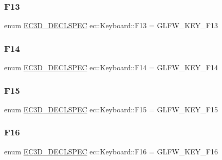 \mbox{\label{classec_1_1_keyboard_a57c5cc1e503cb08d453b6fee1f2dea47}} 
\subsubsection{\texorpdfstring{F13}{F13}}
{\footnotesize\ttfamily enum \mbox{\hyperlink{_common_8h_aac42573e202ca3dd4d259c81691e2369}{E\+C3\+D\+\_\+\+D\+E\+C\+L\+S\+P\+EC}} ec\+::\+Keyboard\+::\+F13 = G\+L\+F\+W\+\_\+\+K\+E\+Y\+\_\+\+F13}

\mbox{\label{classec_1_1_keyboard_aa85c5264f6d7cc445d7b8ad9ad5b9eac}} 
\subsubsection{\texorpdfstring{F14}{F14}}
{\footnotesize\ttfamily enum \mbox{\hyperlink{_common_8h_aac42573e202ca3dd4d259c81691e2369}{E\+C3\+D\+\_\+\+D\+E\+C\+L\+S\+P\+EC}} ec\+::\+Keyboard\+::\+F14 = G\+L\+F\+W\+\_\+\+K\+E\+Y\+\_\+\+F14}

\mbox{\label{classec_1_1_keyboard_afdf2d1dc1df9357757c30e63a274e331}} 
\subsubsection{\texorpdfstring{F15}{F15}}
{\footnotesize\ttfamily enum \mbox{\hyperlink{_common_8h_aac42573e202ca3dd4d259c81691e2369}{E\+C3\+D\+\_\+\+D\+E\+C\+L\+S\+P\+EC}} ec\+::\+Keyboard\+::\+F15 = G\+L\+F\+W\+\_\+\+K\+E\+Y\+\_\+\+F15}

\mbox{\label{classec_1_1_keyboard_aaf2f8c127d0f27fe1b6c9c13512ccffe}} 
\subsubsection{\texorpdfstring{F16}{F16}}
{\footnotesize\ttfamily enum \mbox{\hyperlink{_common_8h_aac42573e202ca3dd4d259c81691e2369}{E\+C3\+D\+\_\+\+D\+E\+C\+L\+S\+P\+EC}} ec\+::\+Keyboard\+::\+F16 = G\+L\+F\+W\+\_\+\+K\+E\+Y\+\_\+\+F16}

